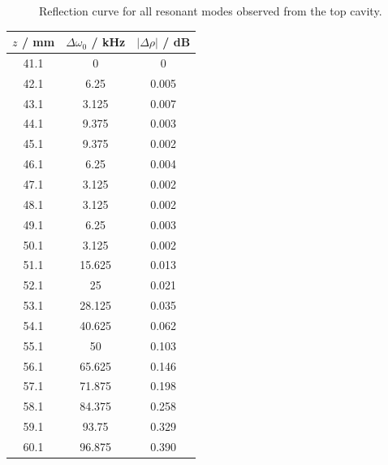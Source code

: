 \documentclass[a4paper]{report}
\numberwithin{equation}{section}
\begin{document}
\begin{figure}[htb!]
	\quad

	\caption{Reflection curve for all resonant modes observed from the top cavity.
}
\end{figure}


\begin{table}[!ht]
    \centering
    \begin{tabular}{|c|c|c|}
    \hline
        $z$ / mm & $\Delta\omega_0$ / kHz & $|\Delta\rho|$ / dB \\ \hline
        41.1 & 0 & 0 \\ \hline
        42.1 & 6.25 & 0.005 \\ \hline
        43.1 & 3.125 & 0.007 \\ \hline
        44.1 & 9.375 & 0.003 \\ \hline
        45.1 & 9.375 & 0.002 \\ \hline
        46.1 & 6.25 & 0.004 \\ \hline
        47.1 & 3.125 & 0.002 \\ \hline
        48.1 & 3.125 & 0.002 \\ \hline
        49.1 & 6.25 & 0.003 \\ \hline
        50.1 & 3.125 & 0.002 \\ \hline
        51.1 & 15.625 & 0.013 \\ \hline
        52.1 & 25 & 0.021 \\ \hline
        53.1 & 28.125 & 0.035 \\ \hline
        54.1 & 40.625 & 0.062 \\ \hline
        55.1 & 50 & 0.103 \\ \hline
        56.1 & 65.625 & 0.146 \\ \hline
        57.1 & 71.875 & 0.198 \\ \hline
        58.1 & 84.375 & 0.258 \\ \hline
        59.1 & 93.75 & 0.329 \\ \hline
        60.1 & 96.875 & 0.390 \\ \hline

\end{tabular}
\end{table}
\end{document}
